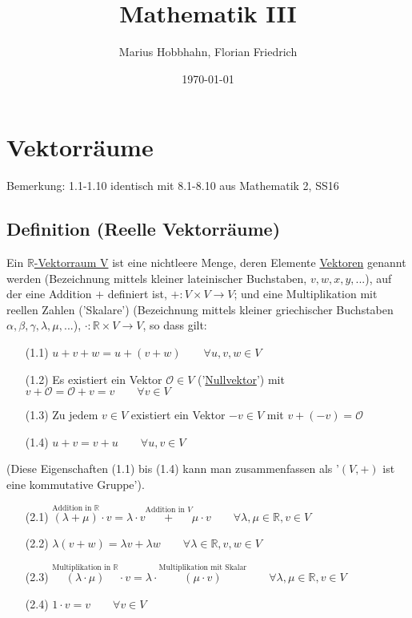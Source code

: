 \documentclass[12pt,titlepage, pdf]{article}
\title{Mathematik III}
\date{\today}
\author{Marius Hobbhahn, Florian Friedrich}
\newcommand{\R}{\mathds{R}}
\renewcommand{\>}{\rightarrow}
\renewcommand{\*}{\cdot}
\renewcommand{\O}{\mathcal{O}}
\begin{document}
	\maketitle
	\tableofcontents
	\newpage
	\section{Vektorräume}
	\small{Bemerkung: 1.1-1.10 identisch mit 8.1-8.10 aus Mathematik 2, SS16}
	\subsection{Definition (Reelle Vektorräume)}
	\label{1.1}
	Ein \underline{$\R$-Vektorraum V} ist eine nichtleere Menge, deren Elemente \underline{Vektoren} genannt werden (Bezeichnung mittels kleiner lateinischer Buchstaben, $v,w,x,y,...$), auf der eine Addition $+$ definiert ist, $+\colon V\times V\>V$; und eine Multiplikation mit reellen Zahlen ('Skalare') (Bezeichnung mittels kleiner griechischer Buchstaben $\alpha, \beta, \gamma, \lambda,\mu,...$), $\*\colon\R\times V\>V$, so dass gilt:
	\begin{itemize}
		\item[(1.1)] \label{1.1(1.1)}$u+v+w=u+(v+w)\qquad\forall u,v,w\in V$
	   	\item[(1.2)] \label{1.1(1.2)}Es existiert ein Vektor $\O\in V$ ('\underline{Nullvektor}') mit $v+\O=\O+v=v\qquad\forall v\in V$
	   	\item[(1.3)] \label{1.1(1.3)} Zu jedem $v\in V$ existiert ein Vektor $-v\in V$ mit $v+(-v)=\O$
		\item[(1.4)] $u+v=v+u\qquad\forall u,v\in V$
	\end{itemize}
	(Diese Eigenschaften (1.1) bis (1.4) kann man zusammenfassen als '$(V,+)$ ist eine kommutative Gruppe').
	\begin{itemize}
		\item[(2.1)] \label{1.1(2.1)}$\overset{\textrm{Addition in }\R}{(\lambda+\mu)}\*v=\lambda\*v\overset{\textrm{Addition in }V}{+}\mu\*v\qquad\forall\lambda,\mu\in\R,v\in V$
		\item[(2.2)] $\lambda(v+w)=\lambda v+\lambda w\qquad\forall\lambda\in\R,v,w\in V$
		\item[(2.3)] $\overset{\textrm{Multiplikation in }\R}{(\lambda\*\mu)}\*v=\lambda\*\overset{\textrm{Multiplikation mit Skalar}}{(\mu\*v)}\qquad\forall\lambda,\mu\in\R,v\in V$
		\item[(2.4)] $1\*v=v\qquad\forall v\in V$
	\end{itemize}
\end{document}
